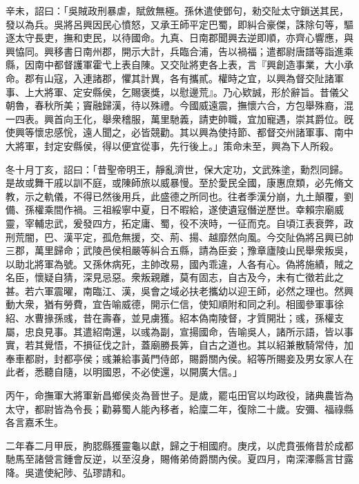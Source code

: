 \begin{pinyinscope}
 
 辛未，詔曰：「吳賊政刑暴虐，賦斂無極。孫休遣使鄧句，勑交阯太守鎖送其民，發以為兵。吳將呂興因民心憤怒，又承王師平定巴蜀，即糾合豪傑，誅除句等，驅逐太守長吏，撫和吏民，以待國命。九真、日南郡聞興去逆即順，亦齊心響應，與興恊同。興移書日南州郡，開示大計，兵臨合浦，告以禍福；遣都尉唐譜等詣進乘縣，因南中都督護軍霍弋上表自陳。又交阯將吏各上表，言『興創造事業，大小承命。郡有山寇，入連諸郡，懼其計異，各有攜貳。權時之宜，以興為督交阯諸軍事、上大將軍、定安縣侯，乞賜褒獎，以慰邊荒』。乃心欵誠，形於辭旨。昔儀父朝魯，春秋所美；竇融歸漢，待以殊禮。今國威遠震，撫懷六合，方包舉殊裔，混一四表。興首向王化，舉衆稽服，萬里馳義，請吏帥職，宜加寵遇，崇其爵位。旣使興等懷忠感恱，遠人聞之，必皆競勸。其以興為使持節、都督交州諸軍事、南中大將軍，封定安縣侯，得以便宜從事，先行後上。」策命未至，興為下人所殺。
 
 
 
 
 冬十月丁亥，詔曰：「昔聖帝明王，靜亂濟世，保大定功，文武殊塗，勳烈同歸。是故或舞干戚以訓不庭，或陳師旅以威暴慢。至於愛民全國，康惠庶類，必先脩文教，示之軌儀，不得已然後用兵，此盛德之所同也。往者季漢分崩，九土顛覆，劉備、孫權乘間作禍。三祖綏寧中夏，日不暇給，遂使遺寇僭逆歷世。幸賴宗廟威靈，宰輔忠武，爰發四方，拓定庸、蜀，役不浹時，一征而克。自頃江表衰弊，政刑荒闇，巴、漢平定，孤危無援，交、荊、揚、越靡然向風。今交阯偽將呂興已帥三郡，萬里歸命；武陵邑侯相嚴等糾合五縣，請為臣妾；豫章廬陵山民舉衆叛吳，以助北將軍為號。又孫休病死，主帥改易，國內乖違，人各有心。偽將施績，賊之名臣，懷疑自猜，深見忌惡。衆叛親離，莫有固志，自古及今，未有亡徵若此之甚。若六軍震曜，南臨江、漢，吳會之域必扶老攜幼以迎王師，必然之理也。然興動大衆，猶有勞費，宜告喻威德，開示仁信，使知順附和同之利。相國參軍事徐紹、水曹掾孫彧，昔在壽春，並見虜獲。紹本偽南陵督，才質開壯；彧，孫權支屬，忠良見事。其遣紹南還，以彧為副，宣揚國命，告喻吳人，諸所示語，皆以事實，若其覺悟，不損征伐之計，蓋廟勝長筭，自古之道也。其以紹兼散騎常侍，加奉車都尉，封都亭侯；彧兼給事黃門侍郎，賜爵關內侯。紹等所賜妾及男女家人在此者，悉聽自隨，以明國恩，不必使還，以開廣大信。」
 
 
 
 
 丙午，命撫軍大將軍新昌鄉侯炎為晉世子。是歲，罷屯田官以均政役，諸典農皆為太守，都尉皆為令長；勸募蜀人能內移者，給廩二年，復除二十歲。安彌、福祿縣各言嘉禾生。
 
 
 
 
 二年春二月甲辰，朐䏰縣獲靈龜以獻，歸之于相國府。庚戌，以虎賁張脩昔於成都馳馬至諸營言鍾會反逆，以至沒身，賜脩弟倚爵關內侯。夏四月，南深澤縣言甘露降。吳遣使紀陟、弘璆請和。
 
 
 

\end{pinyinscope}

